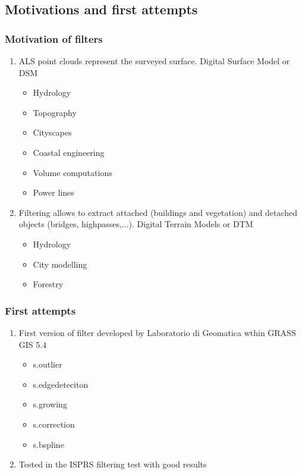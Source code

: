 \subsection{Motivations and first attempts}
\begin{frame}[label=filter_motivation]
    \frametitle{Motivation of filters}
    \begin{enumerate}
	\item ALS point clouds represent the surveyed surface. Digital Surface Model or \alert{DSM} 
	\begin{itemize}
	 \item Hydrology
	 \item Topography
	 \item Cityscapes 
	 \item Coastal engineering
	 \item Volume computations 
	 \item Power lines
	\end{itemize}
	\item Filtering allows to extract attached (buildings and vegetation) and detached objects (bridges, highpasses,...). Digital Terrain Models or \alert{DTM}
	\begin{itemize}
	 \item Hydrology
	 \item City modelling
	 \item Forestry
	\end{itemize}
    \end{enumerate}
\end{frame}
\begin{frame}
    \frametitle{First attempts}
    \begin{enumerate}
	\item First version of filter developed by Laboratorio di Geomatica wthin GRASS GIS 5.4
	\begin{itemize}
	  \item s.outlier
	  \item s.edgedeteciton
	  \item s.growing
	  \item s.correction
	  \item s.bspline
	\end{itemize}
	\item Tested in the ISPRS filtering test with good results
    \end{enumerate}
\end{frame}
